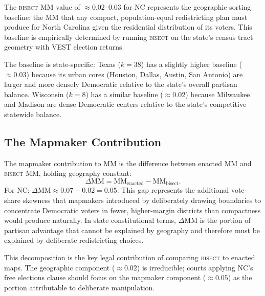 The \textsc{bisect} MM value of $\approx 0.02$--$0.03$ for NC represents the
geographic sorting baseline: the MM that any compact, population-equal redistricting
plan must produce for North Carolina given the residential distribution of its
voters. This baseline is empirically determined by running \textsc{bisect} on
the state's census tract geometry with VEST election returns.

The baseline is state-specific: Texas ($k=38$) has a slightly higher baseline
($\approx 0.03$) because its urban cores (Houston, Dallas, Austin, San Antonio)
are larger and more densely Democratic relative to the state's overall partisan
balance. Wisconsin ($k=8$) has a similar baseline ($\approx 0.02$) because
Milwaukee and Madison are dense Democratic centers relative to the state's
competitive statewide balance.

\subsection{The Mapmaker Contribution}

The mapmaker contribution to MM is the difference between enacted MM and
\textsc{bisect} MM, holding geography constant:
\[
\Delta\text{MM} = \text{MM}_{\text{enacted}} - \text{MM}_{\text{bisect}}.
\]
For NC: $\Delta\text{MM} \approx 0.07 - 0.02 = 0.05$. This gap represents
the additional vote-share skewness that mapmakers introduced by deliberately
drawing boundaries to concentrate Democratic voters in fewer, higher-margin
districts than compactness would produce naturally. In state constitutional
terms, $\Delta\text{MM}$ is the portion of partisan advantage that cannot
be explained by geography and therefore must be explained by deliberate
redistricting choices.

This decomposition is the key legal contribution of comparing \textsc{bisect}
to enacted maps. The geographic component ($\approx 0.02$) is irreducible;
courts applying NC's free elections clause should focus on the mapmaker
component ($\approx 0.05$) as the portion attributable to deliberate manipulation.
